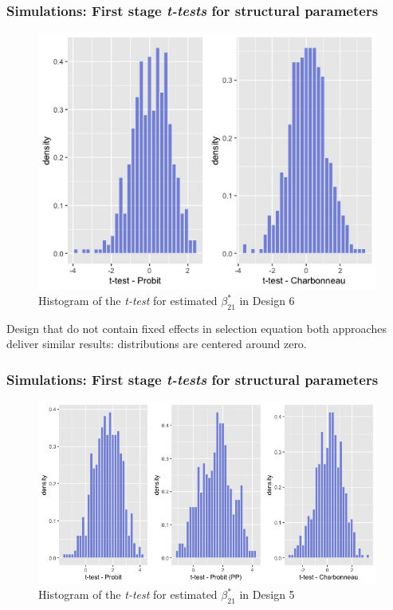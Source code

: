 \begin{frame}
    \frametitle{Simulations: First stage \textit{t-tests} for structural parameters}
    \begin{figure}
        \centerline{\includegraphics[scale=0.35]{content/Figures/ttest_beta21_Design6.png}}
        \caption{\footnotesize{Histogram of the \textit{t-test} for estimated $\beta_{21}^*$ in Design 6}}
        \label{ttest_beta21_Design6}
      \end{figure}
    Design that do not contain fixed effects in selection equation both approaches deliver similar results: distributions are centered around zero.
\end{frame}

\begin{frame}
    \frametitle{Simulations: First stage \textit{t-tests} for structural parameters}
    \begin{figure}
        \centerline{\includegraphics[scale=.35]{content/Figures/ttest_beta21_Design5.png}}
        \caption{\footnotesize{Histogram of the \textit{t-test} for estimated $\beta_{21}^*$ in Design 5}}
        \label{ttest_beta21_Design5}
      \end{figure}
\end{frame}

